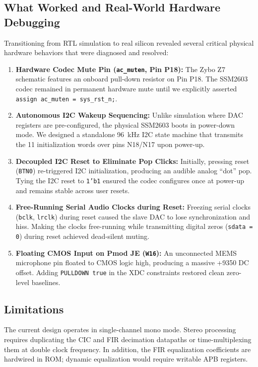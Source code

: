 \documentclass[11pt,a4paper]{article}
\begin{document}
\subsection{What Worked and Real-World Hardware Debugging}
Transitioning from RTL simulation to real silicon revealed several critical physical hardware behaviors that were diagnosed and resolved:
\begin{enumerate}
  \item \textbf{Hardware Codec Mute Pin (\texttt{ac\_muten}, Pin P18):} The Zybo Z7 schematic features an onboard pull-down resistor on Pin P18. The SSM2603 codec remained in permanent hardware mute until we explicitly asserted \texttt{assign ac\_muten = sys\_rst\_n;}.
  \item \textbf{Autonomous I2C Wakeup Sequencing:} Unlike simulation where DAC registers are pre-configured, the physical SSM2603 boots in power-down mode. We designed a standalone 96~kHz I2C state machine that transmits the 11 initialization words over pins N18/N17 upon power-up.
  \item \textbf{Decoupled I2C Reset to Eliminate Pop Clicks:} Initially, pressing reset (\texttt{BTN0}) re-triggered I2C initialization, producing an audible analog ``dot'' pop. Tying the I2C reset to \texttt{1'b1} ensured the codec configures once at power-up and remains stable across user resets.
  \item \textbf{Free-Running Serial Audio Clocks during Reset:} Freezing serial clocks (\texttt{bclk}, \texttt{lrclk}) during reset caused the slave DAC to lose synchronization and hiss. Making the clocks free-running while transmitting digital zeros (\texttt{sdata = 0}) during reset achieved dead-silent muting.
  \item \textbf{Floating CMOS Input on Pmod JE (\texttt{W16}):} An unconnected MEMS microphone pin floated to CMOS logic high, producing a massive +9350 DC offset. Adding \texttt{PULLDOWN true} in the XDC constraints restored clean zero-level baselines.
\end{enumerate}

\subsection{Limitations}
The current design operates in single-channel mono mode. Stereo processing requires duplicating the CIC and FIR decimation datapaths or time-multiplexing them at double clock frequency. In addition, the FIR equalization coefficients are hardwired in ROM; dynamic equalization would require writable APB registers.
\end{document}
